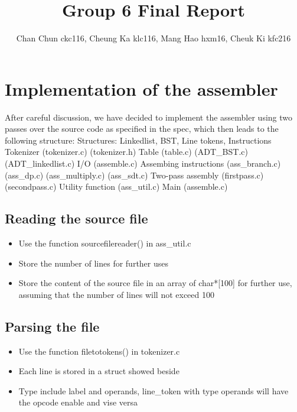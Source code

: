\documentclass[11pt]{article}
\begin{document}
\title{Group 6 Final Report}
\author{Chan Chun ckc116, Cheung Ka klc116, Mang Hao hxm16, Cheuk Ki kfc216}

\maketitle

\section{Implementation of the assembler}

 
After careful discussion, we have decided to implement the assembler using two passes over the source code as specified in the spec, which then leads to the following structure:\newline\newline
Structures:
Linkedlist,
BST,
Line tokens,
Instructions
\newline
Tokenizer
(tokenizer.c)
(tokenizer.h)\newline
Table
(table.c)
(ADT{\_}BST.c)
(ADT{\_}linkedlist.c)\newline
I/O
(assemble.c)\newline
Assembing instructions
(ass{\_}branch.c)
(ass{\_}dp.c)
(ass{\_}multiply.c)
(ass{\_}sdt.c)\newline
Two-pass assembly
(firstpass.c)
(secondpass.c)\newline
Utility function
(ass{\_}util.c)\newline
Main
(assemble.c)

\subsection{Reading the source file}
\begin{itemize}  
\item Use the function sourcefilereader()  in ass{\_}util.c

\item Store the number of lines for further uses 

\item Store the content of the source file in an array of char*[100] for further use, assuming that the number of lines will not exceed 100  

\end{itemize}





\subsection{Parsing the file}
\begin{itemize}  
\item Use the function filetotokens() in tokenizer.c
\item Each line is stored in a struct showed beside
\item Type include label and operands, line{\_}token with type operands will have the opcode enable and vise versa
\end{itemize}
\end{document}

